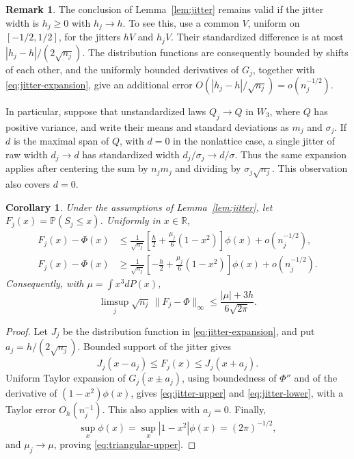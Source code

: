 \documentclass[aop]{imsart}
\theoremstyle{plain}
\newtheorem{corollary}[theorem]{Corollary}
\theoremstyle{definition}
\theoremstyle{definition}
\newtheorem{remark}[theorem]{Remark}
\newcommand{\PP}{\mathbb P}
\newcommand{\R}{\mathbb R}
\begin{document}
\begin{remark}\label{rem:jitter-width}
The conclusion of Lemma~\ref{lem:jitter} remains valid if the jitter
width is \(h_j\ge0\) with \(h_j\to h\).  To see this, use a common
\(V\), uniform on \([-1/2,1/2]\), for the jitters \(hV\) and
\(h_jV\).  Their standardized difference is at most
\(|h_j-h|/(2\sqrt{n_j})\).  The distribution functions are consequently
bounded by shifts of each other, and the uniformly bounded derivatives
of \(G_j\), together with \eqref{eq:jitter-expansion}, give an additional
error \(O(|h_j-h|/\sqrt{n_j})=o(n_j^{-1/2})\).

In particular, suppose that unstandardized laws \(Q_j\to Q\) in
\(W_3\), where \(Q\) has positive variance, and write their means and
standard deviations as \(m_j\) and \(\sigma_j\).  If \(d\) is the
maximal span of \(Q\), with \(d=0\) in the nonlattice case, a single
jitter of raw width \(d_j\to d\) has standardized width
\(d_j/\sigma_j\to d/\sigma\).  Thus the same expansion applies after
centering the sum by \(n_jm_j\) and dividing by
\(\sigma_j\sqrt{n_j}\).  This observation also covers \(d=0\).
\end{remark}

\begin{corollary}\label{cor:jitter-envelopes}
Under the assumptions of Lemma~\ref{lem:jitter}, let
\(F_j(x)=\PP(S_j\le x)\).  Uniformly in \(x\in\R\),
\begin{align}
 F_j(x)-\Phi(x)
 &\le\frac1{\sqrt{n_j}}
       \left[\frac h2+\frac{\mu_j}{6}(1-x^2)\right]\phi(x)
       +o(n_j^{-1/2}),\label{eq:jitter-upper}\\
 F_j(x)-\Phi(x)
 &\ge\frac1{\sqrt{n_j}}
       \left[-\frac h2+\frac{\mu_j}{6}(1-x^2)\right]\phi(x)
       +o(n_j^{-1/2}).\label{eq:jitter-lower}
\end{align}
Consequently, with \(\mu=\int x^3dP(x)\),
\begin{equation}\label{eq:triangular-upper}
 \limsup_j\sqrt{n_j}\,\|F_j-\Phi\|_\infty
 \le\frac{|\mu|+3h}{6\sqrt{2\pi}}.
\end{equation}
\end{corollary}

\begin{proof}
Let \(J_j\) be the distribution function in
\eqref{eq:jitter-expansion}, and put \(a_j=h/(2\sqrt{n_j})\).
Bounded support of the jitter gives
\[
 J_j(x-a_j)\le F_j(x)\le J_j(x+a_j).
\]
Uniform Taylor expansion of \(G_j(x\pm a_j)\), using boundedness of
\(\Phi''\) and of the derivative of \((1-x^2)\phi(x)\), gives
\eqref{eq:jitter-upper} and \eqref{eq:jitter-lower}, with a Taylor
error \(O_h(n_j^{-1})\).  This also applies with \(a_j=0\).
Finally,
\[
 \sup_x\phi(x)=\sup_x|1-x^2|\phi(x)=(2\pi)^{-1/2},
\]
and \(\mu_j\to\mu\), proving \eqref{eq:triangular-upper}.
\end{proof}
\end{document}
